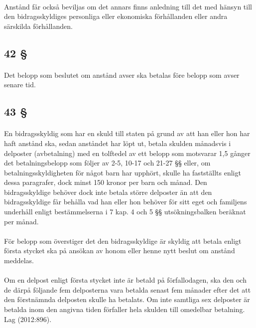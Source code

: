 \documentclass[a4paper,notitlepage,openany,10pt]{book}
\begin{document}
\paragraph*{}
Anstånd får också beviljas om det annars finns anledning till det med hänsyn till den bidragsskyldiges personliga eller ekonomiska förhållanden eller andra särskilda förhållanden.
\subsection*{42 §}
\paragraph*{}
Det belopp som beslutet om anstånd avser ska betalas före belopp som avser senare tid.
\subsection*{43 §}
\paragraph*{}
En bidragsskyldig som har en skuld till staten på grund av att han eller hon har haft anstånd ska, sedan anståndet har löpt ut, betala skulden månadsvis i delposter (avbetalning) med en tolftedel av ett belopp som motsvarar 1,5 gånger det betalningsbelopp som följer av 2-5, 10-17 och 21-27 §§ eller, om betalningsskyldigheten för något barn har upphört, skulle ha fastställts enligt dessa paragrafer, dock minst 150 kronor per barn och månad. Den bidragsskyldige behöver dock inte betala större delposter än att den bidragsskyldige får behålla vad han eller hon behöver för sitt eget och familjens underhåll enligt bestämmelserna i 7 kap. 4 och 5 §§ utsökningsbalken beräknat per månad.
\paragraph*{}
För belopp som överstiger det den bidragsskyldige är skyldig att betala enligt första stycket ska på ansökan av honom eller henne nytt beslut om anstånd meddelas.
\paragraph*{}
Om en delpost enligt första stycket inte är betald på förfallodagen, ska den och de därpå följande fem delposterna vara betalda senast fem månader efter det att den förstnämnda delposten skulle ha betalats. Om inte samtliga sex delposter är betalda inom den angivna tiden förfaller hela skulden till omedelbar betalning.
Lag (2012:896).
\end{document}
